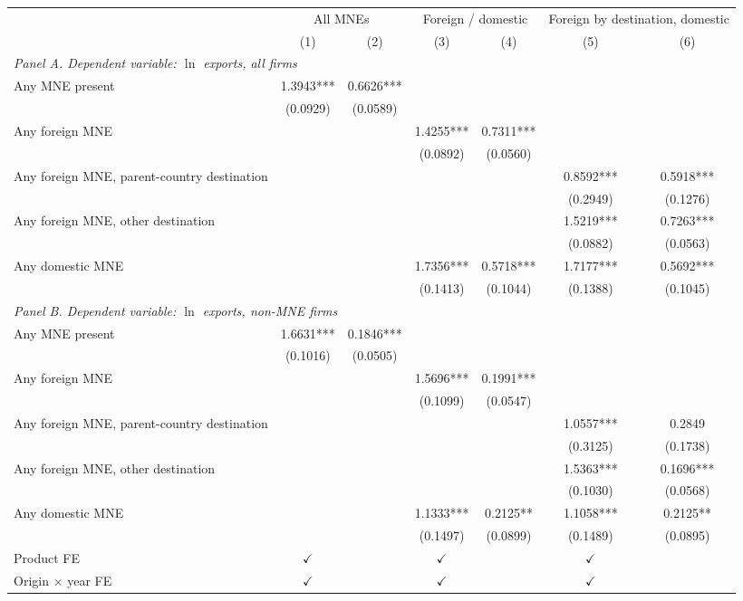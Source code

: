\begin{tabular}{lcccccc} \hline
 & \multicolumn{2}{c}{All MNEs} & \multicolumn{2}{c}{Foreign / domestic} & \multicolumn{2}{c}{Foreign by destination, domestic} \\
 & (1) & (2) & (3) & (4) & (5) & (6) \\ \hline
\multicolumn{7}{l}{\textit{Panel A. Dependent variable: $\ln$ exports, all firms}} \\
Any MNE present & 1.3943*** & 0.6626*** &  &  &  &  \\
 & (0.0929) & (0.0589) &  &  &  &  \\
Any foreign MNE &  &  & 1.4255*** & 0.7311*** &  &  \\
 &  &  & (0.0892) & (0.0560) &  &  \\
Any foreign MNE, parent-country destination &  &  &  &  & 0.8592*** & 0.5918*** \\
 &  &  &  &  & (0.2949) & (0.1276) \\
Any foreign MNE, other destination &  &  &  &  & 1.5219*** & 0.7263*** \\
 &  &  &  &  & (0.0882) & (0.0563) \\
Any domestic MNE &  &  & 1.7356*** & 0.5718*** & 1.7177*** & 0.5692*** \\
 &  &  & (0.1413) & (0.1044) & (0.1388) & (0.1045) \\
\midrule
\multicolumn{7}{l}{\textit{Panel B. Dependent variable: $\ln$ exports, non-MNE firms}} \\
Any MNE present & 1.6631*** & 0.1846*** &  &  &  &  \\
 & (0.1016) & (0.0505) &  &  &  &  \\
Any foreign MNE &  &  & 1.5696*** & 0.1991*** &  &  \\
 &  &  & (0.1099) & (0.0547) &  &  \\
Any foreign MNE, parent-country destination &  &  &  &  & 1.0557*** & 0.2849 \\
 &  &  &  &  & (0.3125) & (0.1738) \\
Any foreign MNE, other destination &  &  &  &  & 1.5363*** & 0.1696*** \\
 &  &  &  &  & (0.1030) & (0.0568) \\
Any domestic MNE &  &  & 1.1333*** & 0.2125** & 1.1058*** & 0.2125** \\
 &  &  & (0.1497) & (0.0899) & (0.1489) & (0.0895) \\
\hline
Product FE & $\checkmark$ &  & $\checkmark$ &  & $\checkmark$ &  \\
Origin $\times$ year FE & $\checkmark$ &  & $\checkmark$ &  & $\checkmark$ &  \\

\end{tabular}
